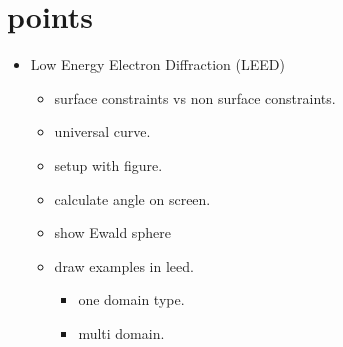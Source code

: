 \documentclass[article,a4paper,openleft]{memoir}
\begin{document}
\section{points}
\begin{itemize}
        \begin{itemize}
                \item Relaxation
                \item reconstruction
                        \begin{itemize}
                                \item woods notation.
                                \item matrix notation.
                                \item figure with both examples $(4\times2)$ and $C(4\times2)$
                        \end{itemize}
        \end{itemize}
        \item Low Energy Electron Diffraction (LEED)
                \begin{itemize}
                        \item surface constraints vs non surface constraints.
                        \item universal curve.
                        \item setup with figure.
                        \item calculate angle on screen.
                        \item show Ewald sphere
                        \item draw examples in leed.
                                \begin{itemize}
                                        \item one domain type.
                                        \item multi domain.
                                \end{itemize}
                \end{itemize}
\end{itemize}
\end{document}
